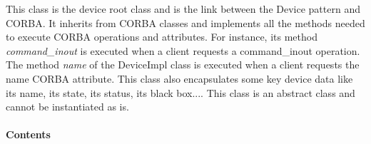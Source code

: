 This class is the device root class and is the link between the Device
pattern and CORBA. It inherits from
CORBA classes and implements all the methods needed to execute CORBA
operations and attributes. For instance, its method \emph{command\_inout}
is executed when a client requests a command\_inout operation. The
method \emph{name} of the DeviceImpl class is executed
when a client requests the name CORBA attribute. This class also encapsulates
some key device data like its name, its state,
its status, its black box.... This
class is an abstract class and cannot be instantiated as is. 


\paragraph{Contents}

